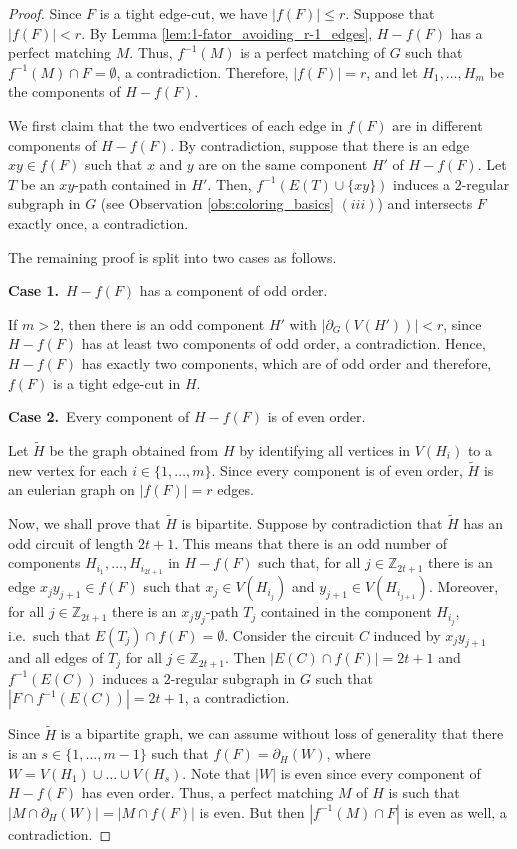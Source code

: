 \documentclass[a4paper,11pt]{article}
\newcommand{\numberset}{\mathbb}
\newcommand{\Z}{\numberset{Z}}
\theoremstyle{remark}
\begin{document}
\begin{proof}
	Since $ F $ is a tight edge-cut, we have $|f(F)|\leq r.$
	Suppose that $|f(F)|<r.$ By Lemma \ref{lem:1-fator_avoiding_r-1_edges}, $H-f(F)$ has a perfect matching  $M$. Thus, $f^{-1}(M)$ is a perfect matching of $G$ such that $f^{-1}(M)\cap F = \emptyset$, a contradiction. Therefore, $|f(F)|=r$, and let $H_1,\dots, H_m$ be the components of $H-f(F)$.
	
	We first claim that the two endvertices of each edge in $ f(F)$ are in different components of $H-f(F)$. By contradiction, suppose that there is an edge $xy\in f(F)$ such that $x$ and $y$ are on the same component $H'$ of $H-f(F)$. Let $T$ be an $xy$-path contained in $H'$. Then, $f^{-1}(E(T)\cup \{xy\} )$ induces a $2$-regular subgraph in $G$ (see Observation \ref{obs:coloring_basics} $ (iii) $) and intersects $F$ exactly once, a contradiction. 
	
	The remaining proof is split into two cases as follows.
	
	{\bf Case 1.}\ $H-f(F)$ has a component of odd order.
	
	If $m>2$, then there is an odd component $H'$ with $\vert \partial_G(V(H'))| <r$, since $H-f(F)$ has at least two components of odd order, a contradiction. Hence, $H-f(F)$ has exactly two components, which are of odd order and therefore, $f(F)$ is a tight edge-cut in $H$.
	
	{\bf Case 2.}\ Every component of $H-f(F)$ is of even order. 
	
	Let $\tilde{H}$ be the graph obtained from $H$ by identifying all vertices in $V(H_i)$ to a new vertex for each $i \in \{1,\ldots,m\}$.
	Since every component is of even order, $\tilde{H}$ is an eulerian graph on $|f(F)|=r$ edges. 
	
	Now, we shall prove that $\tilde{H}$ is bipartite.
	Suppose by contradiction that $\tilde{H}$ has an odd circuit of length $2t+1$. This means that there is an odd number of components $H_{i_1},\dots,H_{i_{2t+1}}$ in $H-f(F)$ such that, for all $j\in \Z_{2t+1}$ there is an edge $x_jy_{j+1}\in f(F)$ such that $x_j\in V(H_{i_j})$ and $y_{j+1}\in V(H_{i_{j+1}})$. Moreover, for all $j\in\Z_{2t+1}$ there is an $x_jy_j$-path $T_j$ contained in the component $H_{i_j}$, i.e.\ such that $E(T_j)\cap f(F)=\emptyset$. Consider the circuit $C$ induced by    $x_jy_{j+1}$ and all edges of $T_j$ for all $j\in\Z_{2t+1}$. Then $|E(C)\cap f(F)|=2t+1$ and $f^{-1}(E(C))$ induces a $2$-regular subgraph in $G$ such that $|F\cap f^{-1}( E(C))|=2t+1$, a contradiction.	
	
	Since $\tilde{H}$ is a bipartite graph, we can assume without loss of generality that there is an $s\in\{1,\dots,m-1\}$ such that $f(F) = \partial_H(W)$, where $W = V(H_1)\cup\dots\cup V(H_s)$. Note that $|W|$ is even since every component of $H-f(F)$ has even order. Thus, a perfect matching $M$ of $H$ is such that $|M\cap \partial_H(W)| = |M\cap f(F)|$ is even. But then $|f^{-1}(M)\cap F|$ is even as well, a contradiction.
\end{proof}
\end{document}
